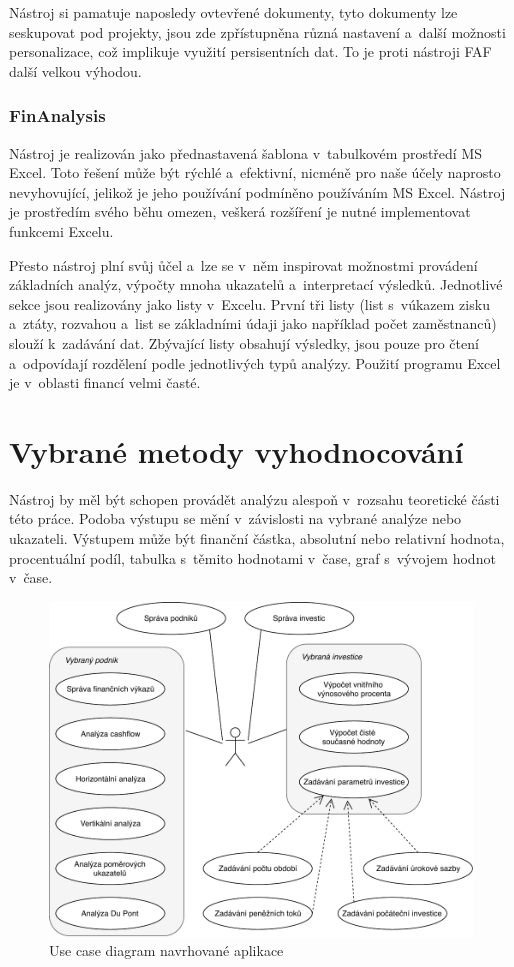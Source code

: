 Nástroj si pamatuje naposledy ovtevřené dokumenty, tyto dokumenty lze seskupovat pod projekty, jsou zde zpřístupněna různá nastavení a~další možnosti personalizace, což implikuje využití persisentních dat. To je proti nástroji FAF další velkou výhodou. 


\subsubsection{FinAnalysis}
Nástroj je realizován jako přednastavená šablona v~tabulkovém prostředí MS Excel. Toto řešení může být rýchlé a~efektivní, nicméně pro naše účely naprosto nevyhovující, jelikož je jeho používání podmíněno používáním MS Excel. Nástroj je prostředím svého běhu omezen, veškerá rozšíření je nutné implementovat funkcemi Excelu.

Přesto nástroj plní svůj ůčel a~lze se v~něm inspirovat možnostmi provádení základních analýz, výpočty mnoha ukazatelů a~interpretací výsledků. Jednotlivé sekce jsou realizovány jako listy v~Excelu. První tři listy (list s~vúkazem zisku a~ztáty, rozvahou a~list se základními údaji jako například počet zaměstnanců) slouží k~zadávání dat. Zbývající listy obsahují výsledky, jsou pouze pro čtení a~odpovídají rozdělení podle jednotlivých typů analýzy. Použití programu Excel je v~oblasti financí velmi časté.



\section{Vybrané metody vyhodnocování}
Nástroj by měl být schopen provádět analýzu alespoň v~rozsahu teoretické části této práce. Podoba výstupu se mění v~závislosti na vybrané analýze nebo ukazateli. Výstupem může být finanční částka, absolutní nebo relativní hodnota, procentuální podíl, tabulka s~těmito hodnotami v~čase, graf s~vývojem hodnot v~čase.

\begin{figure}
  \centering
  \includegraphics[width=14cm]{img/ucd.pdf}
  \caption{Use case diagram navrhované aplikace}
\end{figure}


